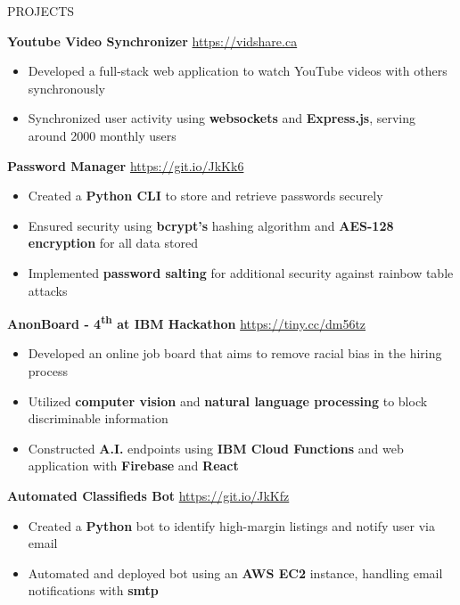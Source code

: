 \documentclass[letterpaper,11pt,oneside]{article}
\newcommand{\createHeading}[1]{
    \vspace{1.25em}
    \hline
    \vspace{-1.5ex}
    \begin{center}
        #1
    \end{center}
    \vspace{-1.5ex}
    \hline
    \vspace{1.25em}
}
\begin{document}
\createHeading{PROJECTS}
\begin{addmargin}[.6em]{.6em}
    \textbf{Youtube Video Synchronizer} \hfill \href{https://vidshare.ca}{https://vidshare.ca}
    \begin{itemize}
        \item Developed a full-stack web application to watch YouTube videos with others synchronously
        \item Synchronized user activity using \textbf{websockets} and \textbf{Express.js}, serving around 2000 monthly users
    \end{itemize}
    \vspace{1.25em}
    \textbf{Password Manager} \hfill \href{https://git.io/JkKk6}{https://git.io/JkKk6}
    \begin{itemize}
        \item Created a \textbf{Python CLI} to store and retrieve passwords securely 
        \item Ensured security using \textbf{bcrypt's} hashing algorithm and \textbf{AES-128 encryption} for all data stored
        \item Implemented \textbf{password salting} for additional security against rainbow table attacks
    \end{itemize}
    \vspace{1.25em}
    \textbf{AnonBoard - 4\textsuperscript{th} at IBM Hackathon} \hfill \href{https://tiny.cc/dm56tz}{https://tiny.cc/dm56tz}
    \begin{itemize}
        \item Developed an online job board that aims to remove racial bias in the hiring process
        \item Utilized \textbf{computer vision} and \textbf{natural language processing} to block discriminable information
        \item Constructed \textbf{A.I.} endpoints using \textbf{IBM Cloud Functions} and web application with \textbf{Firebase} and \textbf{React}
    \end{itemize}
    \vspace{1.25em}
    \textbf{Automated Classifieds Bot} \hfill \href{https://git.io/JkKfz}{https://git.io/JkKfz}
    \begin{itemize}
        \item Created a \textbf{Python} bot to identify high-margin listings and notify user via email
        \item Automated and deployed bot using an \textbf{AWS EC2} instance, handling email notifications with \textbf{smtp}

\end{itemize}
\end{addmargin}
\end{document}
